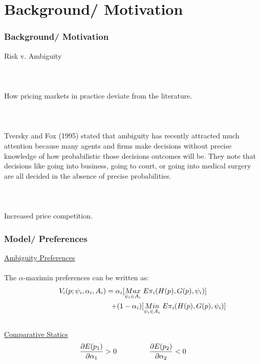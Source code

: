 \documentclass[red]{beamer}
\begin{document}
\section{Background/ Motivation}
\begin{frame} [t]
\frametitle{Background/ Motivation}
Risk v. Ambiguity \\~\\ \\~\\

How pricing markets in practice deviate from the literature. \\~\\ \\~\\



 Tversky and Fox (1995) stated that ambiguity has recently attracted much attention because many agents and firms make decisions without precise knowledge of how probabilistic those decisions outcomes will be. They note that decisions like going into business, going to court, or going into medical surgery are all decided in the absence of precise probabilities. \\~\\ \\~\\
 
 Increased price competition. 
\end{frame}







\begin{frame} [t]
\frametitle{Model/ Preferences}
\underline{Ambiguity Preferences}\\~\\
The $\alpha$-maximin preferences can be written as:
\begin{multline}
    V_i (p; \psi_i, \alpha_i, A_i) = \alpha_i [\underset{\psi_{i} \in A_{i}}{Max}\; E\pi_i(H(p), G(p), \psi_i)] \\ \hspace*{100pt} + (1 - \alpha_i) [\underset{\psi_{i} \in A_{i}}{Min}\; E\pi_i(H(p), G(p), \psi_i)] 
    \label{VV}
\end{multline}
\\
\underline{Comparative Statics}
\begin{equation}
    \frac{\partial E(p_1)}{\partial \alpha_1} > 0 \hspace*{45pt} \frac{\partial E(p_2)}{\partial \alpha_2} < 0
\end{equation}
\end{frame}
\end{document}

